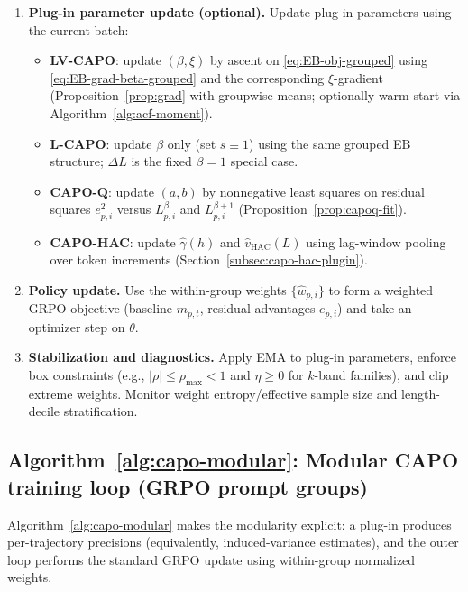 \begin{enumerate}
  \item \textbf{Plug-in parameter update (optional).} Update plug-in parameters using the current batch:
  \begin{itemize}
    \item \textbf{LV-CAPO}: update $(\beta,\xi)$ by ascent on \eqref{eq:EB-obj-grouped} using \eqref{eq:EB-grad-beta-grouped} and the corresponding $\xi$-gradient (Proposition~\ref{prop:grad} with groupwise means; optionally warm-start via Algorithm~\ref{alg:acf-moment}).
    \item \textbf{L-CAPO}: update $\beta$ only (set $s\equiv 1$) using the same grouped EB structure; $\Delta L$ is the fixed $\beta=1$ special case.
    \item \textbf{CAPO-Q}: update $(a,b)$ by nonnegative least squares on residual squares $e_{p,i}^2$ versus $L_{p,i}^{\beta}$ and $L_{p,i}^{\beta+1}$ (Proposition~\ref{prop:capoq-fit}).
    \item \textbf{CAPO-HAC}: update $\widehat\gamma(h)$ and $\widehat v_{\mathrm{HAC}}(L)$ using lag-window pooling over token increments (Section~\ref{subsec:capo-hac-plugin}).
  \end{itemize}

  \item \textbf{Policy update.} Use the within-group weights $\{\widehat w_{p,i}\}$ to form a weighted GRPO objective (baseline $m_{p,t}$, residual advantages $e_{p,i}$) and take an optimizer step on $\theta$.

  \item \textbf{Stabilization and diagnostics.} Apply EMA to plug-in parameters, enforce box constraints (e.g., $|\rho|\le\rho_{\max}<1$ and $\eta\ge 0$ for $k$-band families), and clip extreme weights. Monitor weight entropy/effective sample size and length-decile stratification.
\end{enumerate}

\subsection{Algorithm~\ref{alg:capo-modular}: Modular CAPO training loop (GRPO prompt groups)}
Algorithm~\ref{alg:capo-modular} makes the modularity explicit: a plug-in produces per-trajectory precisions (equivalently, induced-variance estimates), and the outer loop performs the standard GRPO update using within-group normalized weights.

